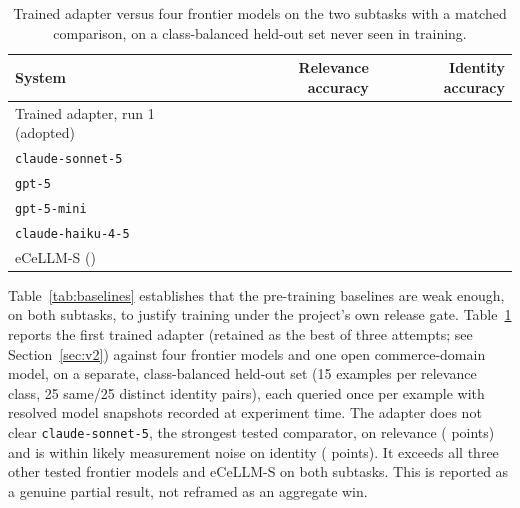 \documentclass{article}
\newcommand{\code}[1]{\texttt{#1}}
\begin{document}
\begin{table}[t]
\centering
\caption{Trained adapter versus four frontier models on the two subtasks with a matched comparison, on a class-balanced held-out set never seen in training.}
\label{tab:frontier}
\begin{tabular}{lrr}
\toprule
System & Relevance accuracy & Identity accuracy \\
\midrule
Trained adapter, run 1 (adopted) & \AdapterOneRelevanceAcc{} & \AdapterOneIdentityAcc{} \\
\code{claude-sonnet-5} & \textbf{\SonnetRelevanceAcc{}} & \textbf{\SonnetIdentityAcc{}} \\
\code{gpt-5} & \GptRelevanceAcc{} & \GptIdentityAcc{} \\
\code{gpt-5-mini} & \GptMiniRelevanceAcc{} & \GptMiniIdentityAcc{} \\
\code{claude-haiku-4-5} & \HaikuRelevanceAcc{} & \HaikuIdentityAcc{} \\
eCeLLM-S (\EcellmParams{}) & \EcellmRelevanceAcc{} & \EcellmIdentityAcc{} \\
\bottomrule
\end{tabular}
\end{table}

Table~\ref{tab:baselines} establishes that the pre-training baselines are weak enough, on both subtasks, to justify training under the project's own release gate. Table~\ref{tab:frontier} reports the first trained adapter (retained as the best of three attempts; see Section~\ref{sec:v2}) against four frontier models and one open commerce-domain model, on a separate, class-balanced held-out set (15 examples per relevance class, 25 same/25 distinct identity pairs), each queried once per example with resolved model snapshots recorded at experiment time. The adapter does not clear \code{claude-sonnet-5}, the strongest tested comparator, on relevance (\RelevanceGapVsSonnet{} points) and is within likely measurement noise on identity (\IdentityGapVsSonnet{} points). It exceeds all three other tested frontier models and eCeLLM-S on both subtasks. This is reported as a genuine partial result, not reframed as an aggregate win.
\end{document}

